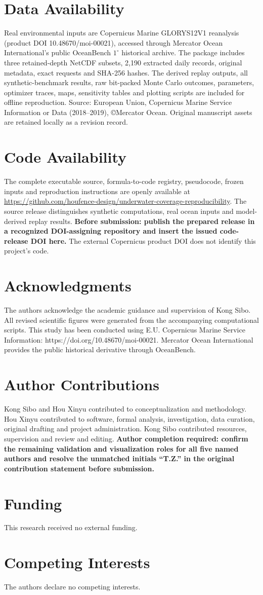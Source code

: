 \documentclass[fleqn,10pt]{wlscirep}
\begin{document}
\section*{Data Availability}
Real environmental inputs are Copernicus Marine GLORYS12V1 reanalysis (product DOI 10.48670/moi-00021), accessed through Mercator Ocean International's public OceanBench $1^\circ$ historical archive\cite{cmems_glorys,oceanbench_archive}. The package includes three retained-depth NetCDF subsets, 2,190 extracted daily records, original metadata, exact requests and SHA-256 hashes. The derived replay outputs, all synthetic-benchmark results, raw bit-packed Monte Carlo outcomes, parameters, optimizer traces, maps, sensitivity tables and plotting scripts are included for offline reproduction. Source: European Union, Copernicus Marine Service Information or Data (2018--2019), \copyright Mercator Ocean. Original manuscript assets are retained locally as a revision record.

\section*{Code Availability}
The complete executable source, formula-to-code registry, pseudocode, frozen inputs and reproduction instructions are openly available at \url{https://github.com/houfence-design/underwater-coverage-reproducibility}. The source release distinguishes synthetic computations, real ocean inputs and model-derived replay results. \textbf{Before submission: publish the prepared release in a recognized DOI-assigning repository and insert the issued code-release DOI here.} The external Copernicus product DOI does not identify this project's code.

\section*{Acknowledgments}
The authors acknowledge the academic guidance and supervision of Kong Sibo. All revised scientific figures were generated from the accompanying computational scripts. This study has been conducted using E.U. Copernicus Marine Service Information: https://doi.org/10.48670/moi-00021. Mercator Ocean International provides the public historical derivative through OceanBench.
\section*{Author Contributions}
Kong Sibo and Hou Xinyu contributed to conceptualization and methodology. Hou Xinyu contributed to software, formal analysis, investigation, data curation, original drafting and project administration. Kong Sibo contributed resources, supervision and review and editing. \textbf{Author completion required: confirm the remaining validation and visualization roles for all five named authors and resolve the unmatched initials ``T.Z.'' in the original contribution statement before submission.}
\section*{Funding}
This research received no external funding.
\section*{Competing Interests}
The authors declare no competing interests.

\end{document}
